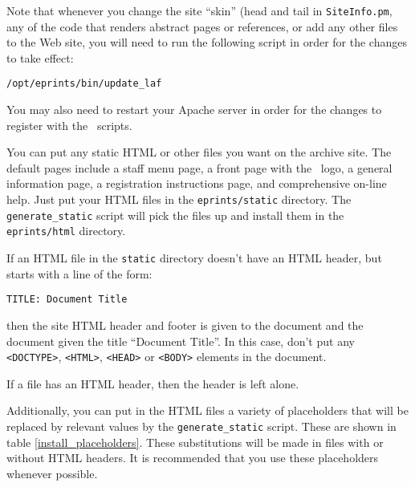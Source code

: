 Note that whenever you change the site ``skin'' (head and tail in {\tt SiteInfo.pm}, any of the code that renders abstract pages or references, or add any other files to the Web site, you will need to run the following script in order for the changes to take effect:

\begin{verbatim}
/opt/eprints/bin/update_laf
\end{verbatim}

You may also need to restart your Apache server in order for the changes to register with the \eprints\ scripts.

You can put any static HTML or other files you want on the archive site. The default pages include a staff menu page, a front page with the \eprints\ logo, a general information page, a registration instructions page, and comprehensive on-line help. Just put your HTML files in the {\tt eprints/static} directory. The {\tt generate\_static} script will pick the files up and install them in the {\tt eprints/html} directory.

If an HTML file in the {\tt static} directory doesn't have an HTML header, but starts with a line of the form:

\begin{verbatim}
TITLE: Document Title
\end{verbatim}

then the site HTML header and footer is given to the document and the document given the title ``Document Title''. In this case, don't put any {\tt <DOCTYPE>}, {\tt <HTML>}, {\tt <HEAD>} or {\tt <BODY>} elements in the document.

If a file has an HTML header, then the header is left alone.

Additionally, you can put in the HTML files a variety of placeholders that will be replaced by relevant values by the {\tt generate\_static} script. These are shown in table \ref{install_placeholders}. These substitutions will be made in files with or without HTML headers. It is recommended that you use these placeholders whenever possible.

